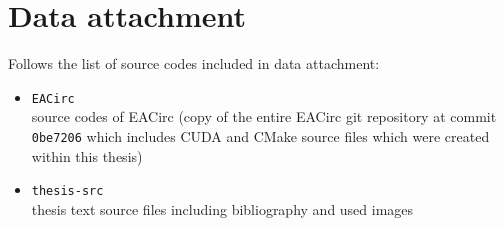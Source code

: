 \documentclass[12pt,twoside]{fithesis2}
\begin{document}
\appendix
\printbibliography[heading=bibintoc]


\chapter{Data attachment}

Follows the list of source codes included in data attachment:

\begin{itemize}
	\item \texttt{EACirc} \hfill \\
	source codes of EACirc (copy of the entire EACirc git repository at commit \texttt{0be7206} which includes CUDA and CMake source files which were created within this thesis)
	\item \texttt{thesis-src} \hfill \\
	thesis text source files including bibliography and used images
\end{itemize}
\end{document}
